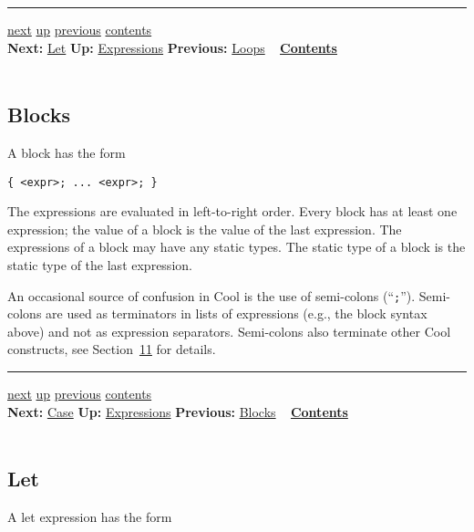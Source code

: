 \documentclass[]{article}
\begin{document}
\begin{center}\rule{3in}{0.4pt}\end{center}

\href{node21.html}{next} \href{node13.html}{up}
\href{node19.html}{previous} \href{node1.html}{contents} \\
\textbf{Next:} \href{node21.html}{Let} \textbf{Up:}
\href{node13.html}{Expressions} \textbf{Previous:}
\href{node19.html}{Loops} ~ \textbf{\href{node1.html}{Contents}} \\ \\

\subsection{Blocks}

A block has the form

\begin{verbatim}
{ <expr>; ... <expr>; }
\end{verbatim}

The expressions are evaluated in left-to-right order. Every block has at
least one expression; the value of a block is the value of the last
expression. The expressions of a block may have any static types. The
static type of a block is the static type of the last expression.

An occasional source of confusion in Cool is the use of semi-colons
(``\texttt{;}''). Semi-colons are used as terminators in lists of
expressions (e.g., the block syntax above) and not as expression
separators. Semi-colons also terminate other Cool constructs, see
Section~\href{node39.html\#sec-gram}{11} for details.

\begin{center}\rule{3in}{0.4pt}\end{center}

\href{node22.html}{next} \href{node13.html}{up}
\href{node20.html}{previous} \href{node1.html}{contents} \\
\textbf{Next:} \href{node22.html}{Case} \textbf{Up:}
\href{node13.html}{Expressions} \textbf{Previous:}
\href{node20.html}{Blocks} ~ \textbf{\href{node1.html}{Contents}} \\ \\

\subsection{Let}

A let expression has the form
\end{document}
